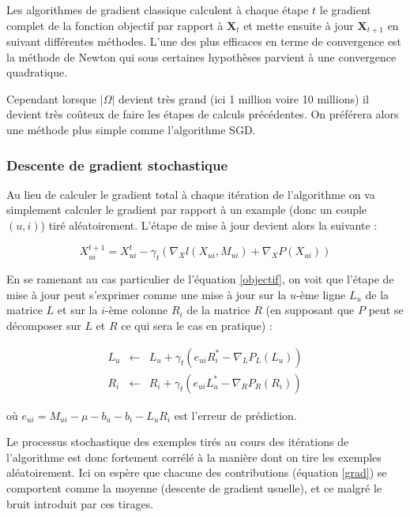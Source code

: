 \documentclass[10pt,a4paper]{article}
\begin{document}
Les algorithmes de gradient classique calculent à chaque étape $t$ le gradient complet de la fonction objectif par rapport à $\textbf{X}_t$ et mette ensuite à jour $\textbf{X}_{t+1}$ en suivant différentes méthodes. L'une des plus efficaces en terme de convergence est la méthode de Newton qui sous certaines hypothèses parvient à une convergence quadratique. 

Cependant lorsque $| \Omega |$ devient très grand (ici 1 million voire 10 millions) il devient très coûteux de faire les étapes de calculs précédentes. On préférera alors une méthode plus simple comme l'algorithme SGD.

\subsubsection*{Descente de gradient stochastique}

Au lieu de calculer le gradient total à chaque itération de l'algorithme on va simplement calculer le gradient par rapport à un example (donc un couple $(u,i)$)  tiré aléatoirement. L'étape de mise à jour devient alors la suivante :

\begin{equation}
\label{grad}
X_{ui}^{t+1} = X_{ui}^t-\gamma_t\left(\nabla_Xl(X_{ui},M_{ui})+\nabla_XP(X_{ui})\right)
\end{equation}


En se ramenant au cas particulier de l'équation \eqref{objectif}, on voit que l'étape de mise à jour peut s'exprimer comme une mise à jour sur la $u$-ème ligne $L_u$ de la matrice $L$ et sur la $i$-ème colonne $R_i$ de la matrice $R$ (en supposant que $P$ peut se décomposer sur $L$ et $R$ ce qui sera le cas en pratique) :


\begin{eqnarray}
\label{grad1}
L_u & \leftarrow & L_u + \gamma_t\left(e_{ui}R_i^*-\nabla_L P_L(L_u)  \right) \\
R_i & \leftarrow & R_i  + \gamma_t\left(e_{ui}L_u^*-\nabla_R P_R(R_i)  \right)
\label{grad2}
\end{eqnarray}

où $e_{ui} = M_{ui} -  \mu - b_u  - b_i-L_{u}R_{i} $ est l'erreur de prédiction.

Le processus stochastique des exemples tirés au cours des itérations de l'algorithme est donc fortement corrélé à la manière dont on tire les exemples aléatoirement. Ici on espère que chacune des contributions (équation \eqref{grad}) se comportent comme la moyenne (descente de gradient usuelle), et ce malgré le bruit introduit par ces tirages.
\end{document}
